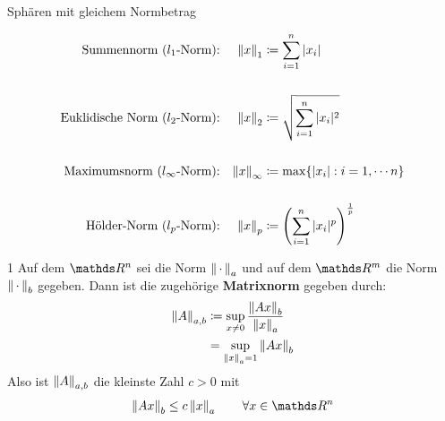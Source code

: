 \begin{Wdhe}[Normen]~
  \label{3.2.3}
  \begin{image}{Sphären mit gleichem Normbetrag}
  \end{image}
  
  \begin{align*}
    \text{Summennorm ($l_1$-Norm):} &&	\nn{x}_1 &\coloneqq \sum_{i=1}^{n}|x_i| 
                                                   \index{Norm!Summennorm}\\
    \\
    \text{Euklidische Norm ($l_2$-Norm):} &&	\nn{x}_2 &\coloneqq \sqrt{\sum_{i=1}^{n}|x_i|^2}
                                                           \index{Norm!Euklidische Norm} \\
    \\
    \text{Maximumsnorm ($l_\infty$-Norm):} &&\nn{x}_\infty &\coloneqq \max\{|x_i| : i=1, \cdots n\} \\
    \index{Norm!Maximumsnorm}
    \\
    \text{Hölder-Norm ($l_p$-Norm):} &&	\nn{x}_p &\coloneqq 
                                                   \left(\sum_{i=1}^{n}|x_i|^p\right)^{\frac{1}{p}} 
                                                   \index{Norm!Hölder-Norm}
  \end{align*}
\end{Wdhe}



\begin{Defe}
1  \label{3.2.4}
  Auf dem $\R^n$  sei die Norm $\left\| \,\cdot\, \right\|_a$ und auf dem $\R^m$ die Norm $\left\| \,\cdot\, \right\|_b$ gegeben.
  Dann ist die zugehörige \textbf{Matrixnorm}  gegeben durch:
  \begin{align}
    \left\| A \right\|_{a,b} &\coloneqq \sup_{x\neq 0} \frac{\left\| Ax \right\|_b}{\left\| x \right\|_a} \\ \nonumber
                 &= \sup_{\left\| x \right\|_a=1} \left\| Ax \right\|_b \label{III.2.1} 
  \end{align}
  Also ist   $\left\| A \right\|_{a,b}$ die kleinste Zahl $c>0$ mit
  \begin{gather*}
    \nn{Ax}_b  \leq c\nn{x}_a \quad\quad \forall x\in \R^n
  \end{gather*}
\end{Defe}

